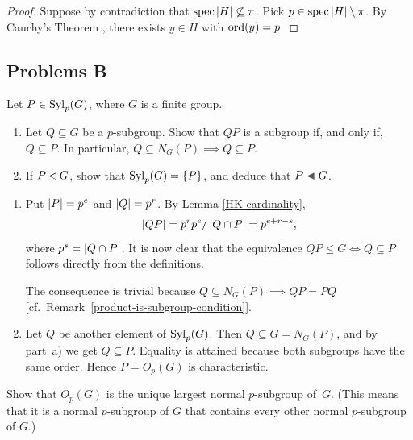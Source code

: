 \begin{proof} Suppose by contradiction that $\operatorname{spec}\left\vert{H}\right\vert\not\subseteq\pi$. Pick $p\in\operatorname{spec}\left\vert{H}\right\vert\setminus\pi$. By Cauchy's Theorem {}, there exists $y\in H$ with ${\rm ord}(y)=p$.  \end{proof}


\subsection{Problems B}
\begin{probl}\label{problem-1.B.1}
    Let $P \in{\rm Syl}_p(G)$, where $G$ is a finite group.
    \begin{enumerate}[\upshape a)]
        \item Let $Q \subseteq G$ be a $p$-subgroup. Show that $QP$ is a subgroup if, and only if, $Q \subseteq P$. In particular, $Q\subseteq N_G(P)\implies Q\subseteq P$.
        \item If\/ $P\lhd G$, show that\/ ${\rm Syl}_p(G) = \{P\}$, and deduce that\/ $P\ch G$.
    \end{enumerate}
\end{probl}

\begin{solution}
\begin{enumerate}[\upshape a)]
    \item Put $\left\vert{P}\right\vert=p^e$ and $\left\vert{Q}\right\vert=p^r$. By Lemma \ref{HK-cardinality},
    $$
        \left\vert{QP}\right\vert = p^rp^e/\left\vert{Q\cap P}\right\vert= p^{e+r-s},
    $$
    where $p^s=\left\vert{Q\cap P}\right\vert$. It is now clear that the equivalence $QP \le G \iff Q \subseteq P$ follows directly from the definitions.

    The consequence is trivial because $Q\subseteq N_G(P)\implies QP=PQ$ [cf.~Remark~\ref{product-is-subgroup-condition}].

    \item Let $Q$ be another element of\/ ${\rm Syl}_p(G)$. Then $Q\subseteq G=N_G(P)$, and by part~a) we get $Q\subseteq P$. Equality is attained because both subgroups have the same order. Hence $P=O_p(G)$ is characteristic.
\end{enumerate}
\end{solution}

\begin{probl}\label{problem-1.B.2}
    Show that $O_p(G)$ is the unique largest normal\/ $p$-subgroup of\/~$G$. (This means that it is a normal\/ $p$-subgroup of\/ $G$ that contains every other normal\/ $p$-subgroup of\/ $G$.)
\end{probl}

